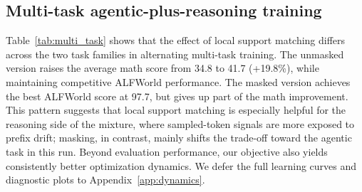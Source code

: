\documentclass{article}
\begin{document}
\subsection{Multi-task agentic-plus-reasoning training}
\label{subsec:multi_task}

Table~\ref{tab:multi_task} shows that the effect of local support matching differs across the two task families in alternating multi-task training.
The unmasked version raises the average math score from 34.8 to 41.7 (+19.8\%), while maintaining competitive ALFWorld performance. The masked version achieves the best ALFWorld score at 97.7, but gives up part of the math improvement. This pattern suggests that local support matching is especially helpful for the reasoning side of the mixture, where sampled-token signals are more exposed to prefix drift; masking, in contrast, mainly shifts the trade-off toward the agentic task in this run.
Beyond evaluation performance, our objective also yields consistently better optimization dynamics.
We defer the full learning curves and diagnostic plots to Appendix~\ref{app:dynamics}.

\begin{table}[ht]
\centering
{}
\caption{Results on batch-alternating multi-task training over ALFWorld and math reasoning.}
\vspace{-0.6em}
\label{tab:multi_task}
\end{table}
\end{document}

